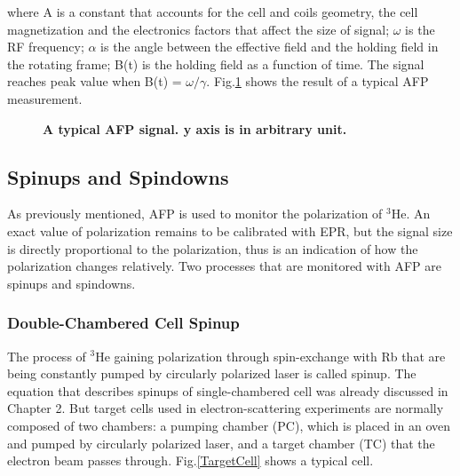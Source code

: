 where A is a constant that accounts for the cell and coils geometry, the cell magnetization and the electronics factors that affect the size of signal; $\omega$ is the RF frequency; $\alpha$ is the angle between the effective field and the holding field in the rotating frame; B(t) is the holding field as a function of time. The signal reaches peak value when B(t) = $\omega/\gamma$. Fig.\ref{AFPSignal} shows the result of a typical AFP measurement.

\begin{figure}[H]\label{AFPSignal}
	\centering
	\caption{{\bf A typical AFP signal. y axis is in arbitrary unit.}}
	\label{AFPSignal}
\end{figure}

\subsection{Spinups and Spindowns}

As previously mentioned, AFP is used to monitor the polarization of $^{3}$He. An exact value of polarization remains to be calibrated with EPR, but the signal size is directly proportional to the polarization, thus is an indication of how the polarization changes relatively. Two processes that are monitored with AFP are spinups and spindowns. 

\subsubsection{Double-Chambered Cell Spinup}

The process of $^{3}$He gaining polarization through spin-exchange with Rb that are being constantly pumped by circularly polarized laser is called spinup. The equation that describes spinups of single-chambered cell was already discussed in Chapter 2. But target cells used in electron-scattering experiments are normally composed of two chambers: a pumping chamber (PC), which is placed in an oven and pumped by circularly polarized laser, and a target chamber (TC) that the electron beam passes through. Fig.\ref{TargetCell} shows a typical cell.

